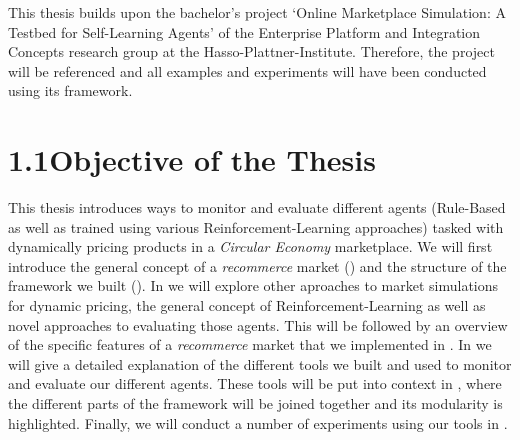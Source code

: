 \begin{jointwork}
	This thesis builds upon the bachelor's project `Online Marketplace Simulation: A Testbed for Self-Learning Agents' of the Enterprise Platform and Integration Concepts research group at the Hasso-Plattner-Institute. Therefore, the project will be referenced and all examples and experiments will have been conducted using its framework.
\end{jointwork}

\section*{1.1\space\space Objective of the Thesis}

This thesis introduces ways to monitor and evaluate different agents (Rule-Based as well as trained using various Reinforcement-Learning approaches) tasked with dynamically pricing products in a \emph{Circular Economy} marketplace.
We will first introduce the general concept of a \emph{recommerce} market () and the structure of the framework we built (). In  we will explore other aproaches to market simulations for dynamic pricing, the general concept of Reinforcement-Learning as well as novel approaches to evaluating those agents. This will be followed by an overview of the specific features of a \emph{recommerce} market that we implemented in . In  we will give a detailed explanation of the different tools we built and used to monitor and evaluate our different agents. These tools will be put into context in , where the different parts of the framework will be joined together and its modularity is highlighted. Finally, we will conduct a number of experiments using our tools in .

